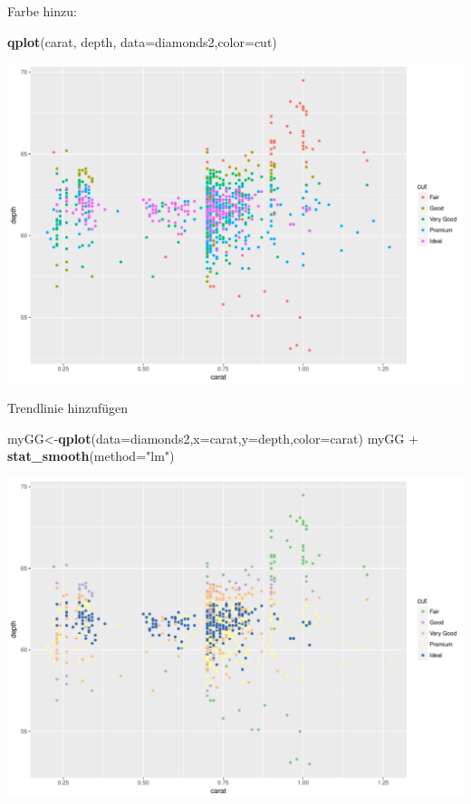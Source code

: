 \documentclass[ignorenonframetext,]{beamer}
\newenvironment{Shaded}{}{}
\newcommand{\KeywordTok}[1]{\textcolor[rgb]{0.00,0.44,0.13}{\textbf{{#1}}}}
\newcommand{\DataTypeTok}[1]{\textcolor[rgb]{0.56,0.13,0.00}{{#1}}}
\newcommand{\StringTok}[1]{\textcolor[rgb]{0.25,0.44,0.63}{{#1}}}
\newcommand{\NormalTok}[1]{{#1}}
\begin{document}
\begin{frame}[fragile]{Farbe hinzu:}

\begin{Shaded}
\begin{Highlighting}[]
\KeywordTok{qplot}\NormalTok{(carat, depth, }\DataTypeTok{data=}\NormalTok{diamonds2,}\DataTypeTok{color=}\NormalTok{cut)}
\end{Highlighting}
\end{Shaded}

\includegraphics{R_intern_files/figure-beamer/unnamed-chunk-247-1.pdf}

\end{frame}

\begin{frame}[fragile]{Trendlinie hinzufügen}

\begin{Shaded}
\begin{Highlighting}[]
\NormalTok{myGG<-}\KeywordTok{qplot}\NormalTok{(}\DataTypeTok{data=}\NormalTok{diamonds2,}\DataTypeTok{x=}\NormalTok{carat,}\DataTypeTok{y=}\NormalTok{depth,}\DataTypeTok{color=}\NormalTok{carat) }
\NormalTok{myGG +}\StringTok{ }\KeywordTok{stat_smooth}\NormalTok{(}\DataTypeTok{method=}\StringTok{"lm"}\NormalTok{)}
\end{Highlighting}
\end{Shaded}

\includegraphics{R_intern_files/figure-beamer/unnamed-chunk-248-1.pdf}

\end{frame}
\end{document}
